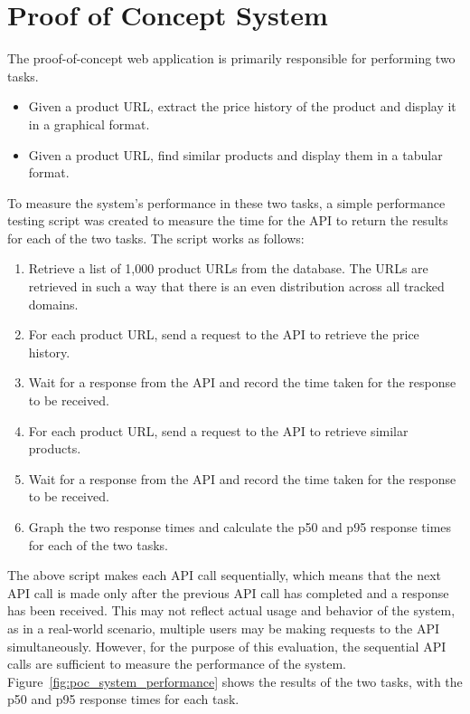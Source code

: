 \section{Proof of Concept System}\label{sec:poc_system_evaluation}

The proof-of-concept web application is primarily responsible for performing two tasks.
\begin{itemize}
    \item{Given a product URL, extract the price history of the product and display it in a graphical format.}
    \item{Given a product URL, find similar products and display them in a tabular format.}
\end{itemize}

To measure the system's performance in these two tasks, a simple performance testing script was created to measure the time for the API to return the results for each of the two tasks.
The script works as follows:
\begin{enumerate}
    \item Retrieve a list of 1,000 product URLs from the database.
        \subitem The URLs are retrieved in such a way that there is an even distribution across all tracked domains.
    \item For each product URL, send a request to the API to retrieve the price history.
    \item Wait for a response from the API and record the time taken for the response to be received.
    \item For each product URL, send a request to the API to retrieve similar products.
    \item Wait for a response from the API and record the time taken for the response to be received.
    \item Graph the two response times and calculate the p50 and p95 response times for each of the two tasks.
\end{enumerate}

The above script makes each API call sequentially, which means that the next API call is made only after the previous API call has completed and a response has been received.
This may not reflect actual usage and behavior of the system, as in a real-world scenario, multiple users may be making requests to the API simultaneously.
However, for the purpose of this evaluation, the sequential API calls are sufficient to measure the performance of the system.
Figure~\ref{fig:poc_system_performance} shows the results of the two tasks, with the p50 and p95 response times for each task.

